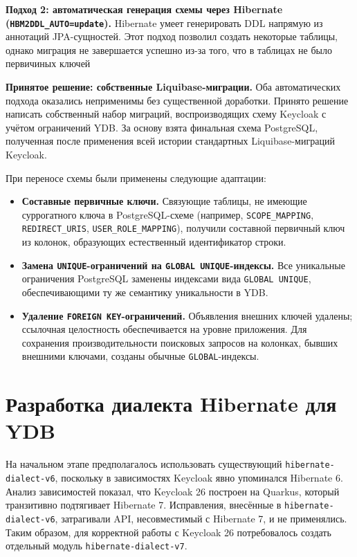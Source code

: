 \documentclass[times]{itmo-student-thesis}
\begin{document}
\textbf{Подход 2: автоматическая генерация схемы через Hibernate (\texttt{HBM2DDL\_AUTO=update}).}
Hibernate умеет генерировать DDL напрямую из аннотаций JPA-сущностей.
Этот подход позволил создать некоторые таблицы, однако миграция не завершается успешно
из-за того, что в таблицах не было первичиных ключей

\textbf{Принятое решение: собственные Liquibase-миграции.}
Оба автоматических подхода оказались неприменимы без существенной доработки.
Принято решение написать собственный набор миграций,
воспроизводящих схему Keycloak с учётом ограничений YDB.
За основу взята финальная схема PostgreSQL, полученная после применения
всей истории стандартных Liquibase-миграций Keycloak.

При переносе схемы были применены следующие адаптации:
\begin{itemize}
    \item \textbf{Составные первичные ключи.}
    Связующие таблицы, не имеющие суррогатного ключа в PostgreSQL-схеме
    (например, \texttt{SCOPE\_MAPPING}, \texttt{REDIRECT\_URIS}, \texttt{USER\_ROLE\_MAPPING}),
    получили составной первичный ключ из колонок, образующих естественный идентификатор строки.

    \item \textbf{Замена \texttt{UNIQUE}-ограничений на \texttt{GLOBAL UNIQUE}-индексы.}
    Все уникальные ограничения PostgreSQL заменены индексами вида
    \texttt{GLOBAL UNIQUE}, обеспечивающими ту же семантику уникальности в YDB.

    \item \textbf{Удаление \texttt{FOREIGN KEY}-ограничений.}
    Объявления внешних ключей удалены; ссылочная целостность обеспечивается
    на уровне приложения. Для сохранения производительности поисковых запросов
    на колонках, бывших внешними ключами, созданы обычные \texttt{GLOBAL}-индексы.
\end{itemize}

\section{Разработка диалекта Hibernate для YDB}

На начальном этапе предполагалось использовать существующий \texttt{hibernate-dialect-v6},
поскольку в зависимостях Keycloak явно упоминался Hibernate 6.
Анализ зависимостей показал, что Keycloak 26 построен на Quarkus,
который транзитивно подтягивает Hibernate 7. Исправления, внесённые в
\texttt{hibernate-dialect-v6}, затрагивали API, несовместимый с Hibernate 7,
и не применялись. Таким образом, для корректной работы с Keycloak 26 потребовалось
создать отдельный модуль \texttt{hibernate-dialect-v7}.
\end{document}
